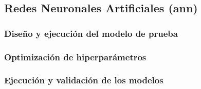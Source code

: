 \subsection{Redes Neuronales Artificiales (\acrshort{ann})}
\label{sec:ann}


\subsubsection{Diseño y ejecución del modelo de prueba}


\subsubsection{Optimización de hiperparámetros}





\subsubsection{Ejecución y validación de los modelos}














